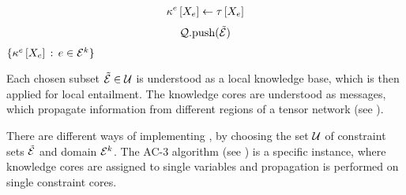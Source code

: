 \begin{algorithm}[hbt!]
\begin{algorithmic}
\begin{align*}
                \end{align*}
                \If{$\hypercoreat{\catvariableof{\edge}}\neq\kcoreofat{\edge}{\catvariableof{\edge}}$}
                    \begin{align*}
                        \kappa^{e}\left[X_{e}\right] \leftarrow \tau\left[X_{e}\right]
                    \end{align*}
                        \begin{align*}
                            \mathcal{Q}\mathrm{.push(}\tilde{\mathcal{E}}\mathrm{)}
                        \end{align*}
                    \EndFor
                \EndIf
            \EndFor
        \EndWhile
        \State \Return $\{\kappa^{e}\left[X_{e}\right]\,:\,e\in\mathcal{E}^{k}\}$
    \end{algorithmic}
\end{algorithm}

Each chosen subset $\tilde{\mathcal{E}}\in\mathcal{U}$ is understood as a local knowledge base, which is then applied for local entailment.
The knowledge cores are understood as messages, which propagate information from different regions of a tensor network (see ).

There are different ways of implementing , by choosing the set $\mathcal{U}$ of constraint sets $\tilde{\mathcal{E}}$ and domain $\mathcal{E}^{k}$. %
The AC-3 algorithm (see \cite{mackworth_consistency_1977}) is a specific instance, where knowledge cores are assigned to single variables and propagation is performed on single constraint cores.


